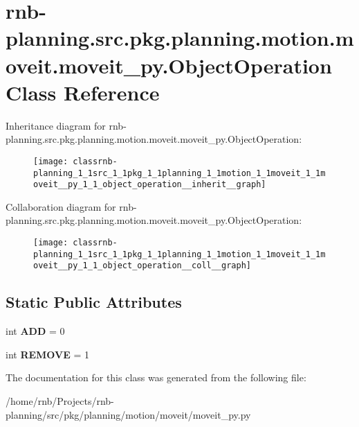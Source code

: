 \hypertarget{classrnb-planning_1_1src_1_1pkg_1_1planning_1_1motion_1_1moveit_1_1moveit__py_1_1_object_operation}{}\section{rnb-\/planning.src.\+pkg.\+planning.\+motion.\+moveit.\+moveit\+\_\+py.\+Object\+Operation Class Reference}
\label{classrnb-planning_1_1src_1_1pkg_1_1planning_1_1motion_1_1moveit_1_1moveit__py_1_1_object_operation}


Inheritance diagram for rnb-\/planning.src.\+pkg.\+planning.\+motion.\+moveit.\+moveit\+\_\+py.\+Object\+Operation\+:\nopagebreak
\begin{figure}[H]
\begin{center}
\leavevmode
\texttt{[image: classrnb-planning\_1\_1src\_1\_1pkg\_1\_1planning\_1\_1motion\_1\_1moveit\_1\_1moveit\_\_py\_1\_1\_object\_operation\_\_inherit\_\_graph]}
\end{center}
\end{figure}


Collaboration diagram for rnb-\/planning.src.\+pkg.\+planning.\+motion.\+moveit.\+moveit\+\_\+py.\+Object\+Operation\+:\nopagebreak
\begin{figure}[H]
\begin{center}
\leavevmode
\texttt{[image: classrnb-planning\_1\_1src\_1\_1pkg\_1\_1planning\_1\_1motion\_1\_1moveit\_1\_1moveit\_\_py\_1\_1\_object\_operation\_\_coll\_\_graph]}
\end{center}
\end{figure}
\subsection*{Static Public Attributes}
\begin{DoxyCompactItemize}
\item 
\mbox{\label{classrnb-planning_1_1src_1_1pkg_1_1planning_1_1motion_1_1moveit_1_1moveit__py_1_1_object_operation_ac329813786da38dcaf163df4d7cf222d}} 
int {\bfseries A\+DD} = 0
\item 
\mbox{\label{classrnb-planning_1_1src_1_1pkg_1_1planning_1_1motion_1_1moveit_1_1moveit__py_1_1_object_operation_a08b1eae9683ee48314d37bca99ff4886}} 
int {\bfseries R\+E\+M\+O\+VE} = 1
\end{DoxyCompactItemize}


The documentation for this class was generated from the following file\+:\begin{DoxyCompactItemize}
\item 
/home/rnb/\+Projects/rnb-\/planning/src/pkg/planning/motion/moveit/moveit\+\_\+py.\+py\end{DoxyCompactItemize}
